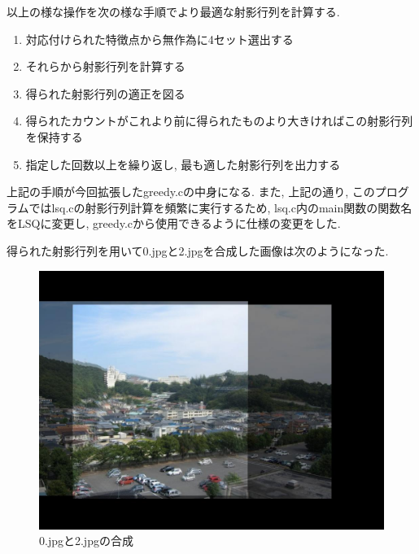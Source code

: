 \documentclass[a4j]{jarticle}
\begin{document}
以上の様な操作を次の様な手順でより最適な射影行列を計算する.

\begin{enumerate}
\item 対応付けられた特徴点から無作為に4セット選出する
\item それらから射影行列を計算する
\item 得られた射影行列の適正を図る
\item 得られたカウントがこれより前に得られたものより大きければこの射影行列を保持する
\item 指定した回数以上を繰り返し, 最も適した射影行列を出力する
\end{enumerate}

上記の手順が今回拡張したgreedy.cの中身になる.
また, 上記の通り, このプログラムではlsq.cの射影行列計算を頻繁に実行するため, lsq.c内のmain関数の関数名をLSQに変更し, greedy.cから使用できるように仕様の変更をした. 

得られた射影行列を用いて0.jpgと2.jpgを合成した画像は次のようになった.


\begin{figure}[b]
\begin{center}
\includegraphics[bb=0 0 768 576,scale=.3]{out.jpg}
\caption{0.jpgと2.jpgの合成}
\end{center}
\end{figure}
\end{document}
